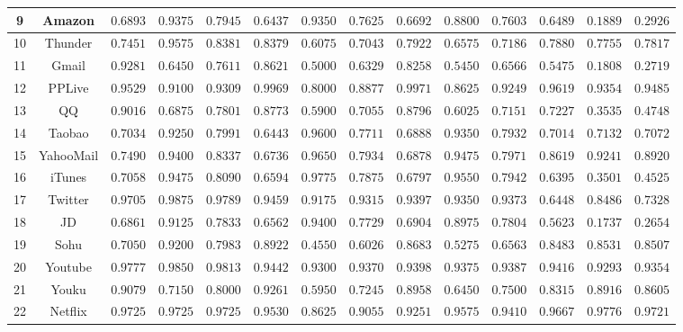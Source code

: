 \documentclass[degree=master,cjk-font=noto]{thuthesis}
\begin{document}
\begin{table}[!htp]
\begin{center}
\begin{tabular}{c|c|c c c|c c c|c c c|c c c}
			9 & Amazon & $0.6893$ & $0.9375$ & $0.7945$ & $0.6437$ & $0.9350$ & $0.7625$ & $0.6692$ & $0.8800$ & $0.7603$ & $0.6489$ & $0.1889$ & $0.2926$  \\\hline
			10 & Thunder & $0.7451$ & $0.9575$ & $0.8381$ & $0.8379$ & $0.6075$ & $0.7043$ & $0.7922$ & $0.6575$ & $0.7186$ & $0.7880$ & $0.7755$ & $0.7817$  \\\hline
			11 & Gmail & $0.9281$ & $0.6450$ & $0.7611$ & $0.8621$ & $0.5000$ & $0.6329$ & $0.8258$ & $0.5450$ & $0.6566$ & $0.5475$ & $0.1808$ & $0.2719$  \\\hline
			12 & PPLive & $0.9529$ & $0.9100$ & $0.9309$ & $0.9969$ & $0.8000$ & $0.8877$ & $0.9971$ & $0.8625$ & $0.9249$ & $0.9619$ & $0.9354$ & $0.9485$  \\\hline
			13 & QQ & $0.9016$ & $0.6875$ & $0.7801$ & $0.8773$ & $0.5900$ & $0.7055$ & $0.8796$ & $0.6025$ & $0.7151$ & $0.7227$ & $0.3535$ & $0.4748$  \\\hline
			14 & Taobao & $0.7034$ & $0.9250$ & $0.7991$ & $0.6443$ & $0.9600$ & $0.7711$ & $0.6888$ & $0.9350$ & $0.7932$ & $0.7014$ & $0.7132$ & $0.7072$  \\\hline
			15 & YahooMail & $0.7490$ & $0.9400$ & $0.8337$ & $0.6736$ & $0.9650$ & $0.7934$ & $0.6878$ & $0.9475$ & $0.7971$ & $0.8619$ & $0.9241$ & $0.8920$ \\\hline
			16 & iTunes & $0.7058$ & $0.9475$ & $0.8090$ & $0.6594$ & $0.9775$ & $0.7875$ & $0.6797$ & $0.9550$ & $0.7942$ & $0.6395$ & $0.3501$ & $0.4525$  \\\hline
			17 & Twitter & $0.9705$ & $0.9875$ & $0.9789$ & $0.9459$ & $0.9175$ & $0.9315$ & $0.9397$ & $0.9350$ & $0.9373$ & $0.6448$ & $0.8486$ & $0.7328$  \\\hline
			18 & JD & $0.6861$ & $0.9125$ & $0.7833$ & $0.6562$ & $0.9400$ & $0.7729$ & $0.6904$ & $0.8975$ & $0.7804$ & $0.5623$ & $0.1737$ & $0.2654$  \\\hline
			19 & Sohu & $0.7050$ & $0.9200$ & $0.7983$ & $0.8922$ & $0.4550$ & $0.6026$ & $0.8683$ & $0.5275$ & $0.6563$ & $0.8483$ & $0.8531$ & $0.8507$  \\\hline
			20 & Youtube & $0.9777$ & $0.9850$ & $0.9813$ & $0.9442$ & $0.9300$ & $0.9370$ & $0.9398$ & $0.9375$ & $0.9387$ & $0.9416$ & $0.9293$ & $0.9354$  \\\hline
			21 & Youku & $0.9079$ & $0.7150$ & $0.8000$ & $0.9261$ & $0.5950$ & $0.7245$ & $0.8958$ & $0.6450$ & $0.7500$ & $0.8315$ & $0.8916$ & $0.8605$  \\\hline
			22 & Netflix & $0.9725$ & $0.9725$ & $0.9725$ & $0.9530$ & $0.8625$ & $0.9055$ & $0.9251$ & $0.9575$ & $0.9410$ & $0.9667$ & $0.9776$ & $0.9721$  \\\hline

\end{tabular}
\end{center}
\end{table}
\end{document}
